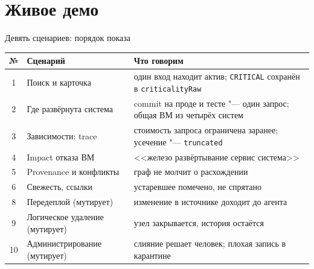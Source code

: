 \section{Живое демо}

\begin{frame}{Девять сценариев: порядок показа}
  \scriptsize\renewcommand{\arraystretch}{0.95}
  \begin{tabular}{@{}cp{3.4cm}p{6cm}@{}}
    \toprule
    № & Сценарий & Что говорим \\
    \midrule
    1 & Поиск и карточка & один вход находит актив; \texttt{CRITICAL} сохранён в \texttt{criticalityRaw} \\
    2 & Где развёрнута система & commit на проде и тесте "--- один запрос; общая ВМ из четырёх систем \\
    3 & Зависимости: trace & стоимость запроса ограничена заранее; усечение "--- \texttt{truncated} \\
    4 & Impact отказа ВМ & <<железо \ar{} развёртывание \ar{} сервис \ar{} система>> \\
    5 & Provenance и конфликты & граф не молчит о расхождении \\
    6 & Свежесть, ссылки & устаревшее помечено, не спрятано \\
    8 & Передеплой (мутирует) & изменение в источнике доходит до агента \\
    9 & Логическое удаление (мутирует) & узел закрывается, история остаётся \\
    10 & Администрирование (мутирует) & слияние решает человек; плохая запись в карантине \\
    \bottomrule
  \end{tabular}
\end{frame}

